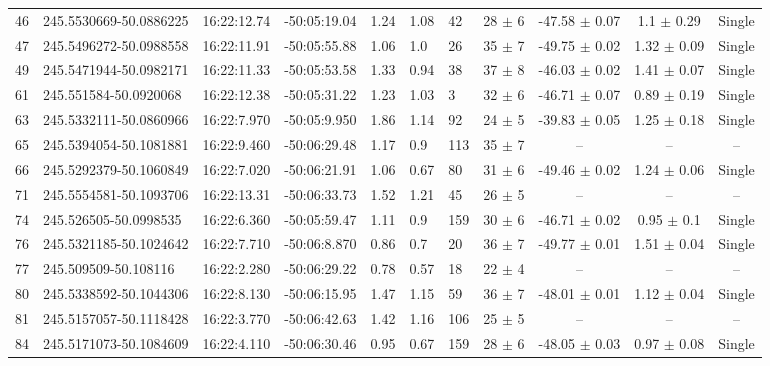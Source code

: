 \documentclass[longauth]{aa} %
\begin{document}
\begin{appendix}
\begin{table}[htbp!]
\begin{tabular}{llllllllccc}
46  &  245.5530669-50.0886225  &  16:22:12.74  &  -50:05:19.04  &  1.24  &  1.08  &  42  &  28 $\pm$ 6  &  -47.58 $\pm$ 0.07  &  1.1 $\pm$ 0.29  &  Single \\
47  &  245.5496272-50.0988558  &  16:22:11.91  &  -50:05:55.88  &  1.06  &  1.0  &  26  &  35 $\pm$ 7  &  -49.75 $\pm$ 0.02  &  1.32 $\pm$ 0.09  &  Single \\
49  &  245.5471944-50.0982171  &  16:22:11.33  &  -50:05:53.58  &  1.33  &  0.94  &  38  &  37 $\pm$ 8  &  -46.03 $\pm$ 0.02  &  1.41 $\pm$ 0.07  &  Single \\
61  &  245.551584-50.0920068  &  16:22:12.38  &  -50:05:31.22  &  1.23  &  1.03  &  3  &  32 $\pm$ 6  &  -46.71 $\pm$ 0.07  &  0.89 $\pm$ 0.19  &  Single \\
63  &  245.5332111-50.0860966  &  16:22:7.970  &  -50:05:9.950  &  1.86  &  1.14  &  92  &  24 $\pm$ 5  &  -39.83 $\pm$ 0.05  &  1.25 $\pm$ 0.18  &  Single \\
65  &  245.5394054-50.1081881  &  16:22:9.460  &  -50:06:29.48  &  1.17  &  0.9  &  113  &  35 $\pm$ 7  &  --  &  --  &  -- \\
66  &  245.5292379-50.1060849  &  16:22:7.020  &  -50:06:21.91  &  1.06  &  0.67  &  80  &  31 $\pm$ 6  &  -49.46 $\pm$ 0.02  &  1.24 $\pm$ 0.06  &  Single \\
71  &  245.5554581-50.1093706  &  16:22:13.31  &  -50:06:33.73  &  1.52  &  1.21  &  45  &  26 $\pm$ 5  &  --  &  --  &  -- \\
74  &  245.526505-50.0998535  &  16:22:6.360  &  -50:05:59.47  &  1.11  &  0.9  &  159  &  30 $\pm$ 6  &  -46.71 $\pm$ 0.02  &  0.95 $\pm$ 0.1  &  Single \\
76  &  245.5321185-50.1024642  &  16:22:7.710  &  -50:06:8.870  &  0.86  &  0.7  &  20  &  36 $\pm$ 7  &  -49.77 $\pm$ 0.01  &  1.51 $\pm$ 0.04  &  Single \\
77  &  245.509509-50.108116  &  16:22:2.280  &  -50:06:29.22  &  0.78  &  0.57  &  18  &  22 $\pm$ 4  &  --  &  --  &  -- \\
80  &  245.5338592-50.1044306  &  16:22:8.130  &  -50:06:15.95  &  1.47  &  1.15  &  59  &  36 $\pm$ 7  &  -48.01 $\pm$ 0.01  &  1.12 $\pm$ 0.04  &  Single \\
81  &  245.5157057-50.1118428  &  16:22:3.770  &  -50:06:42.63  &  1.42  &  1.16  &  106  &  25 $\pm$ 5  &  --  &  --  &  -- \\
84  &  245.5171073-50.1084609  &  16:22:4.110  &  -50:06:30.46  &  0.95  &  0.67  &  159  &  28 $\pm$ 6  &  -48.05 $\pm$ 0.03  &  0.97 $\pm$ 0.08  &  Single \\

\end{tabular}
\end{table}
\end{appendix}
\end{document}
